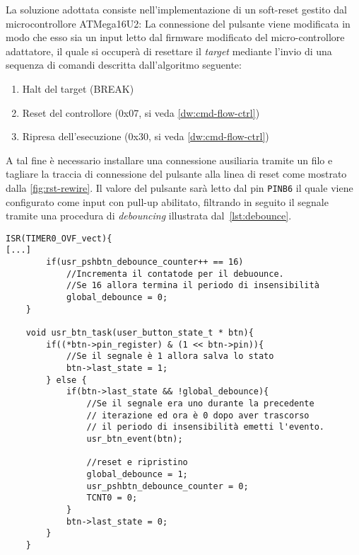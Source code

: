 La soluzione adottata consiste nell'implementazione di un soft-reset gestito dal microcontrollore ATMega16U2: La connessione del pulsante viene modificata in modo che esso sia un input letto dal firmware modificato del micro-controllore adattatore, il quale si occuperà di resettare il \textit{target} mediante l'invio di una sequenza di comandi descritta dall'algoritmo seguente:
\begin{enumerate}
    \item Halt del target (BREAK)
    \item Reset del controllore (0x07, si veda \cref{dw:cmd-flow-ctrl})
    \item Ripresa dell'esecuzione (0x30, si veda \cref{dw:cmd-flow-ctrl})
\end{enumerate}

A tal fine è necessario installare una connessione ausiliaria tramite un filo e tagliare la traccia di connessione del pulsante alla linea di reset come mostrato dalla \cref{fig:rst-rewire}. Il valore del pulsante sarà letto dal pin \texttt{PINB6} il quale viene configurato come input con pull-up abilitato, filtrando in seguito il segnale tramite una procedura di \textit{debouncing} illustrata dal~\cref{lst:debounce}.

\noindent\begin{minipage}{\textwidth}
    \begin{lstlisting}[style=C, caption={Routine di interrupt di TIMER0 per la gestione del debounce}, label=lst:debounce]
    ISR(TIMER0_OVF_vect){
[...]
        if(usr_pshbtn_debounce_counter++ == 16) 
            //Incrementa il contatode per il debuounce.
            //Se 16 allora termina il periodo di insensibilità
            global_debounce = 0;
    }

    void usr_btn_task(user_button_state_t * btn){
        if((*btn->pin_register) & (1 << btn->pin)){
            //Se il segnale è 1 allora salva lo stato
            btn->last_state = 1; 
        } else {
            if(btn->last_state && !global_debounce){
                //Se il segnale era uno durante la precedente 
                // iterazione ed ora è 0 dopo aver trascorso 
                // il periodo di insensibilità emetti l'evento.
                usr_btn_event(btn);

                //reset e ripristino
                global_debounce = 1;
                usr_pshbtn_debounce_counter = 0;
                TCNT0 = 0;
            }
            btn->last_state = 0;
        }
    }
    \end{lstlisting}
\end{minipage}

